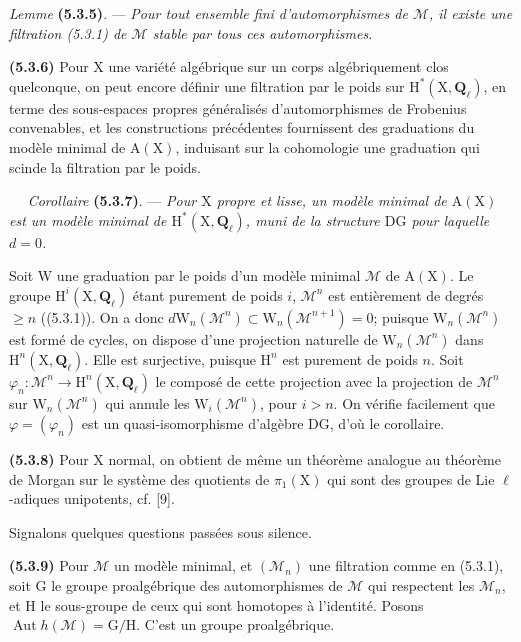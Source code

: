 \documentclass[11pt,leqno]{article}
\newcommand{\Page}[1]{\ifvmode\noindent\else\unskip\ \fi{\footnotesize\textcolor{gray}{[p.\,#1]}}\ \ignorespaces}
\begin{document}
\textit{Lemme} \textbf{(5.3.5)}. — \textit{Pour tout ensemble fini
d’automorphismes de \(\mathscr{M}\), il existe une filtration
\textup{(5.3.1)} de \(\mathscr{M}\) stable par tous ces automorphismes.}

\textbf{(5.3.6)} Pour \(\mathrm{X}\) une variété algébrique sur un corps
algébriquement clos quelconque, on peut encore définir une filtration
par le poids sur \(\mathrm{H}^*(\mathrm{X},\mathbf{Q}_\ell)\), en terme
des sous-espaces propres généralisés d’automorphismes de Frobenius
convenables, et les constructions précédentes fournissent des
graduations du modèle minimal de \(\mathrm{A}(\mathrm{X})\), induisant
sur la cohomologie une graduation qui scinde la filtration par le poids.

\Page{242}
\textit{Corollaire} \textbf{(5.3.7)}. — \textit{Pour \(\mathrm{X}\)
propre et lisse, un modèle minimal de \(\mathrm{A}(\mathrm{X})\) est un
modèle minimal de \(\mathrm{H}^*(\mathrm{X},\mathbf{Q}_\ell)\), muni de
la structure \(\mathrm{DG}\) pour laquelle \(d=0\).}

Soit \(\mathrm{W}\) une graduation par le poids d’un modèle minimal
\(\mathscr{M}\) de \(\mathrm{A}(\mathrm{X})\). Le groupe
\(\mathrm{H}^i(\mathrm{X},\mathbf{Q}_\ell)\) étant purement de poids
\(i\), \(\mathscr{M}^n\) est entièrement de degrés \(\geq n\)
((5.3.1)). On a donc
\(d\mathrm{W}_n(\mathscr{M}^n)\subset
\mathrm{W}_n(\mathscr{M}^{n+1})=0\); puisque
\(\mathrm{W}_n(\mathscr{M}^n)\) est formé de cycles, on dispose d’une
projection naturelle de \(\mathrm{W}_n(\mathscr{M}^n)\) dans
\(\mathrm{H}^n(\mathrm{X},\mathbf{Q}_\ell)\). Elle est surjective,
puisque \(\mathrm{H}^n\) est purement de poids \(n\). Soit
\(\varphi_n:\mathscr{M}^n\to\mathrm{H}^n(\mathrm{X},\mathbf{Q}_\ell)\)
le composé de cette projection avec la projection de \(\mathscr{M}^n\)
sur \(\mathrm{W}_n(\mathscr{M}^n)\) qui annule les
\(\mathrm{W}_i(\mathscr{M}^n)\), pour \(i>n\). On vérifie facilement
que \(\varphi=(\varphi_n)\) est un quasi-isomorphisme d’algèbre
\(\mathrm{DG}\), d’où le corollaire.

\textbf{(5.3.8)} Pour \(\mathrm{X}\) normal, on obtient de même un
théorème analogue au théorème de Morgan sur le système des quotients
de \(\pi_1(\mathrm{X})\) qui sont des groupes de Lie \(\ell\)-adiques
unipotents, cf. [9].

Signalons quelques questions passées sous silence.

\textbf{(5.3.9)} Pour \(\mathscr{M}\) un modèle minimal, et
\((\mathscr{M}_n)\) une filtration comme en (5.3.1), soit \(\mathrm{G}\)
le groupe proalgébrique des automorphismes de \(\mathscr{M}\) qui
respectent les \(\mathscr{M}_n\), et \(\mathrm{H}\) le sous-groupe de
ceux qui sont homotopes à l’identité. Posons
\(\operatorname{Aut}h(\mathscr{M})=\mathrm{G}/\mathrm{H}\).
C’est un groupe proalgébrique.
\end{document}
